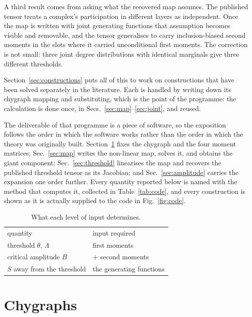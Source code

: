 \documentclass[aps,pre,twocolumn,superscriptaddress,floatfix,longbibliography]{revtex4-2}
\begin{document}
A third result comes from asking what the recovered map assumes. The published
tensor treats a complex's participation in different layers as independent.
Once the map is written with joint generating functions that assumption becomes
visible and removable, and the tensor generalises to carry inclusion-biased
second moments in the slots where it carried unconditional first moments. The
correction is not small: three joint degree distributions with identical
marginals give three different thresholds.

Section~\ref{sec:constructions} puts all of this to work on constructions that
have been solved separately in the literature. Each is handled by writing down
its chygraph mapping and substituting, which is the point of the programme: the
calculation is done once, in Secs.~\ref{sec:map}--\ref{sec:joint}, and reused.

The deliverable of that programme is a piece of software, so the exposition
follows the order in which the software works rather than the order in which the
theory was originally built. Section~\ref{sec:chygraphs} fixes the chygraph and
the four moment matrices; Sec.~\ref{sec:map} writes the non-linear map, solves
it, and obtains the giant component; Sec.~\ref{sec:threshold} linearises the map
and recovers the published threshold tensor as its Jacobian; and
Sec.~\ref{sec:amplitude} carries the expansion one order further. Every quantity
reported below is named with the method that computes it, collected in
Table~\ref{tab:code}, and every construction is shown as it is actually supplied
to the code in Fig.~\ref{fig:code}.


\begin{table}[b]
\caption{\label{tab:hierarchy}What each level of input determines.}
\begin{ruledtabular}
\begin{tabular}{ll}
quantity & input required \\
\colrule
threshold $\theta$, $\Lambda$ & first moments \\
critical amplitude $B$        & $+$ second moments \\
$S$ away from the threshold   & the generating functions \\
\end{tabular}
\end{ruledtabular}
\end{table}

\section{Chygraphs}\label{sec:chygraphs}
\end{document}
